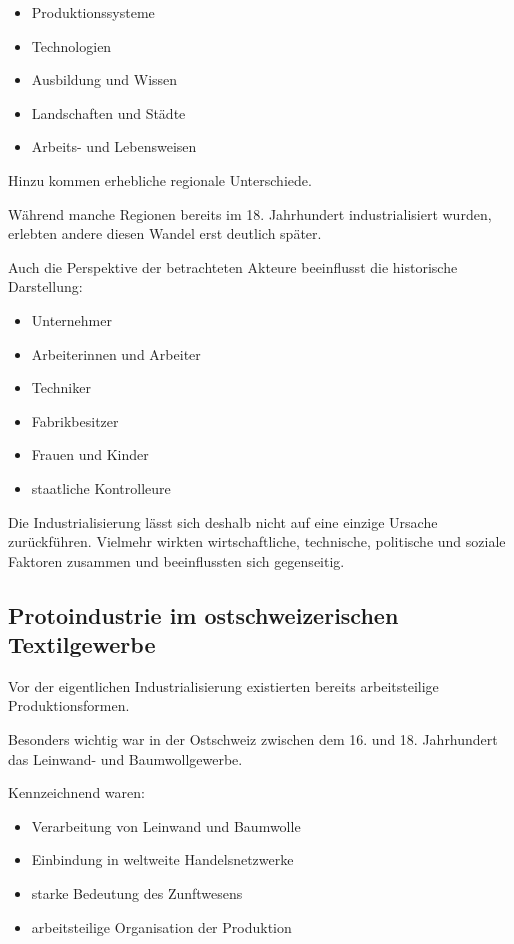 \begin{itemize}
    \item Produktionssysteme
    \item Technologien
    \item Ausbildung und Wissen
    \item Landschaften und Städte
    \item Arbeits- und Lebensweisen
\end{itemize}

Hinzu kommen erhebliche regionale Unterschiede.

Während manche Regionen bereits im 18. Jahrhundert industrialisiert wurden,
erlebten andere diesen Wandel erst deutlich später.

Auch die Perspektive der betrachteten Akteure beeinflusst die historische Darstellung:

\begin{itemize}
    \item Unternehmer
    \item Arbeiterinnen und Arbeiter
    \item Techniker
    \item Fabrikbesitzer
    \item Frauen und Kinder
    \item staatliche Kontrolleure
\end{itemize}

Die Industrialisierung lässt sich deshalb nicht auf eine einzige Ursache zurückführen.
Vielmehr wirkten wirtschaftliche, technische, politische und soziale Faktoren zusammen und beeinflussten sich gegenseitig.

\subsection{Protoindustrie im ostschweizerischen Textilgewerbe}

Vor der eigentlichen Industrialisierung existierten bereits arbeitsteilige Produktionsformen.

Besonders wichtig war in der Ostschweiz zwischen dem 16. und 18. Jahrhundert
das Leinwand- und Baumwollgewerbe.

Kennzeichnend waren:

\begin{itemize}
    \item Verarbeitung von Leinwand und Baumwolle
    \item Einbindung in weltweite Handelsnetzwerke
    \item starke Bedeutung des Zunftwesens
    \item arbeitsteilige Organisation der Produktion
\end{itemize}

